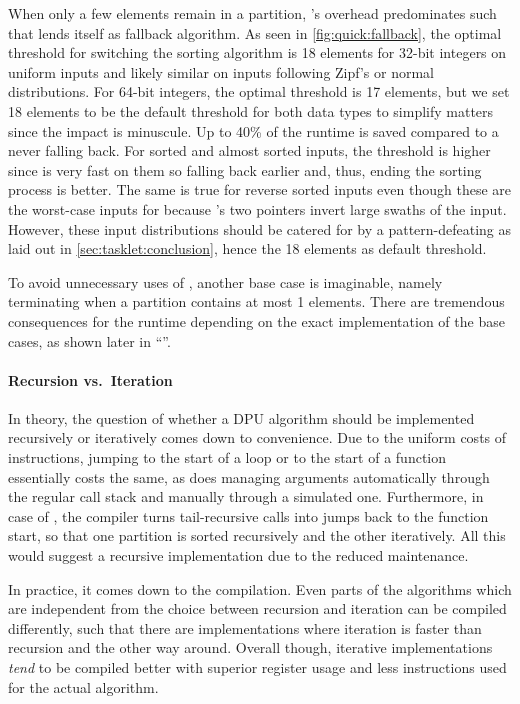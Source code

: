 When only a few elements remain in a partition, \QS{}'s overhead predominates such that \IS{} lends itself as fallback algorithm.
As seen in \cref{fig:quick:fallback}, the optimal threshold for switching the sorting algorithm is 18 elements for 32-bit integers on uniform inputs and likely similar on inputs following Zipf's or normal distributions.
For 64-bit integers, the optimal threshold is 17 elements, but we set 18 elements to be the default threshold for both data types to simplify matters since the impact is minuscule.
Up to 40\% of the runtime is saved compared to a \QS{} never falling back.
For sorted and almost sorted inputs, the threshold is higher since \IS{} is very fast on them so falling back earlier and, thus, ending the sorting process is better.
The same is true for reverse sorted inputs even though these are the worst-case inputs for \IS{} because \QS{}'s two pointers invert large swaths of the input.
However, these input distributions should be catered for by a pattern-defeating \QS{} as laid out in \cref{sec:tasklet:conclusion}, hence the 18 elements as default threshold.

To avoid unnecessary uses of \IS{}, another base case is imaginable, namely terminating when a partition contains at most 1 elements.
There are tremendous consequences for the runtime depending on the exact implementation of the base cases, as shown later in \enquote{}.


\paragraph{Recursion vs.\ Iteration}
In theory, the question of whether a DPU algorithm should be implemented recursively or iteratively comes down to convenience.
Due to the uniform costs of instructions, jumping to the start of a loop or to the start of a function essentially costs the same, as does managing arguments automatically through the regular call stack and manually through a simulated one.
Furthermore, in case of \QS{}, the compiler turns tail-recursive calls into jumps back to the function start, so that one partition is sorted recursively and the other iteratively.
All this would suggest a recursive implementation due to the reduced maintenance.

In practice, it comes down to the compilation.
Even parts of the algorithms which are independent from the choice between recursion and iteration can be compiled differently, such that there are implementations where iteration is faster than recursion and the other way around.
Overall though, iterative implementations \emph{tend} to be compiled better with superior register usage and less instructions used for the actual \QS{} algorithm.


